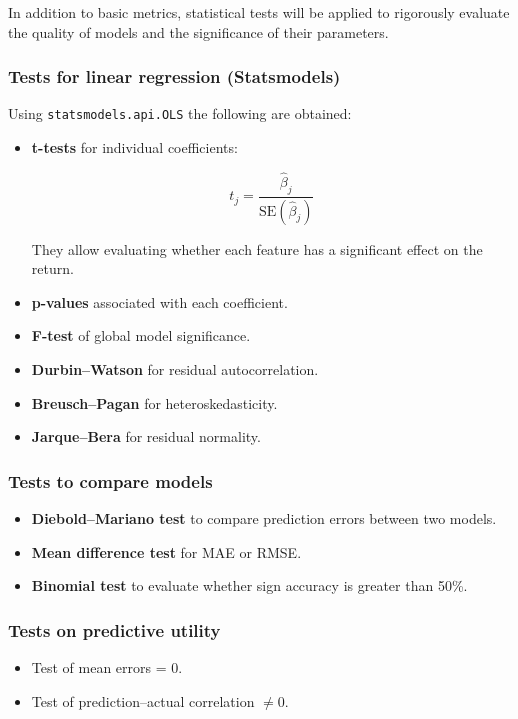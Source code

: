 \documentclass[12pt]{article}
\begin{document}
In addition to basic metrics, statistical tests will be applied to rigorously evaluate the quality of models and the significance of their parameters.

\subsubsection{Tests for linear regression (Statsmodels)}

Using \texttt{statsmodels.api.OLS} the following are obtained:

\begin{itemize}
    \item \textbf{t-tests} for individual coefficients:
    

\[
    t_j = \frac{\hat{\beta}_j}{\text{SE}(\hat{\beta}_j)}
    \]


    They allow evaluating whether each feature has a significant effect on the return.
    \item \textbf{p-values} associated with each coefficient.
    \item \textbf{F-test} of global model significance.
    \item \textbf{Durbin–Watson} for residual autocorrelation.
    \item \textbf{Breusch–Pagan} for heteroskedasticity.
    \item \textbf{Jarque–Bera} for residual normality.
\end{itemize}

\subsubsection{Tests to compare models}

\begin{itemize}
    \item \textbf{Diebold–Mariano test} to compare prediction errors between two models.
    \item \textbf{Mean difference test} for MAE or RMSE.
    \item \textbf{Binomial test} to evaluate whether sign accuracy is greater than 50\%.
\end{itemize}

\subsubsection{Tests on predictive utility}

\begin{itemize}
    \item Test of mean errors = 0.
    \item Test of prediction–actual correlation $\neq 0$.
\end{itemize}
\end{document}
